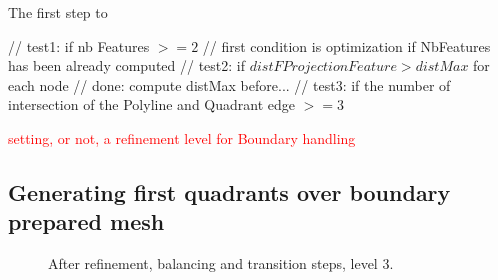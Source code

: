 \documentclass[10pt]{article}
\begin{document}
The first step to 

        // test1: if nb Features $>= 2$
        // first condition is optimization if NbFeatures has been already computed
        // test2: if $distFProjectionFeature > distMax$ for each node
        // done: compute distMax before...
        // test3: if the number of intersection of the Polyline and Quadrant edge $>= 3$


\textcolor{red}{setting, or not, a refinement level for Boundary handling}

\subsection{Generating first quadrants over boundary prepared mesh}


\begin{figure}[htb]
\centering
 \caption{After refinement, balancing and transition steps, level 3.}
\label{fig:generate3}
\end{figure}
\end{document}
